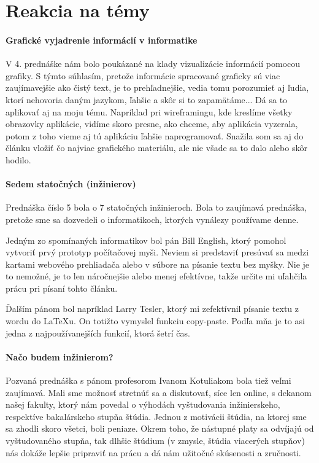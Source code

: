\documentclass[10pt,twoside,slovak,a4paper]{article}
\begin{document}
\section{Reakcia na témy}
\paragraph{Grafické vyjadrenie informácií v informatike}
V 4. prednáške nám bolo poukázané na klady vizualizácie informácií pomocou grafiky. S týmto súhlasím, pretože informácie spracované graficky sú viac zaujímavejšie ako čistý text, je to prehľadnejšie, vedia tomu porozumieť aj ľudia, ktorí nehovoria daným jazykom, ľahšie a skôr si to zapamätáme... Dá sa to aplikovať aj na moju tému. Napríklad pri wireframingu, kde kreslíme všetky obrazovky aplikácie, vidíme skoro presne, ako chceme, aby aplikácia vyzerala, potom z toho vieme aj tú aplikáciu ľahšie naprogramovať. Snažila som sa aj do článku vložiť čo najviac grafického materiálu, ale nie všade sa to dalo alebo skôr hodilo.


\paragraph{Sedem statočných (inžinierov)}
Prednáška číslo 5 bola o 7 statočných inžinieroch. Bola to zaujímavá prednáška, pretože sme sa dozvedeli o informatikoch, ktorých vynálezy používame denne.

Jedným zo spomínaných informatikov bol pán Bill English, ktorý pomohol vytvoriť prvý prototyp počítačovej myši. Neviem si predstaviť presúvať sa medzi kartami webového prehliadača alebo v súbore na písanie textu bez myšky. Nie je to nemožné, je to len náročnejšie alebo menej efektívne, takže určite mi uľahčila prácu pri písaní tohto článku.

Ďalším pánom bol napríklad Larry Tesler, ktorý mi zefektívnil písanie textu z wordu do LaTeXu. On totižto vymyslel funkciu copy-paste. Podľa mňa je to asi jedna z najpoužívanejších funkcií, ktorá šetrí čas.


\paragraph{Načo budem inžinierom?}
Pozvaná prednáška s pánom profesorom Ivanom Kotuliakom bola tiež veľmi zaujímavá. Mali sme možnosť stretnúť sa a diskutovať, síce len online, s dekanom našej fakulty, ktorý nám povedal o výhodách vyštudovania inžinierskeho, respektíve bakalárskeho stupňa štúdia. Jednou z motivácii štúdia, na ktorej sme sa zhodli skoro všetci, boli peniaze. Okrem toho, že nástupné platy sa odvíjajú od vyštudovaného stupňa, tak dlhšie štúdium (v zmysle, štúdia viacerých stupňov) nás dokáže lepšie pripraviť na prácu a dá nám užitočné skúsenosti a zručnosti.
\end{document}
